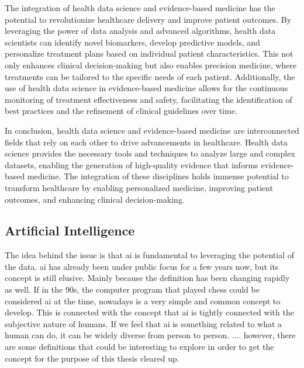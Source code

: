 
The integration of health data science and evidence-based medicine has the potential to revolutionize healthcare delivery and improve patient outcomes. By leveraging the power of data analysis and advanced algorithms, health data scientists can identify novel biomarkers, develop predictive models, and personalize treatment plans based on individual patient characteristics. This not only enhances clinical decision-making but also enables precision medicine, where treatments can be tailored to the specific needs of each patient. Additionally, the use of health data science in evidence-based medicine allows for the continuous monitoring of treatment effectiveness and safety, facilitating the identification of best practices and the refinement of clinical guidelines over time.

In conclusion, health data science and evidence-based medicine are interconnected fields that rely on each other to drive advancements in healthcare. Health data science provides the necessary tools and techniques to analyze large and complex datasets, enabling the generation of high-quality evidence that informs evidence-based medicine. The integration of these disciplines holds immense potential to transform healthcare by enabling personalized medicine, improving patient outcomes, and enhancing clinical decision-making.



\subsection{Artificial Intelligence}
The idea behind the issue is that \ac{ai} is fundamental to leveraging the potential of the data. \ac{ai} has already been under public focus for a few years now, but its concept is still elusive. 
Mainly because the definition has been changing rapidly as well. If in the 90s, the computer program that played chess could be considered \ac{ai} at the time, nowadays is a very simple and common concept to develop. This is connected with the concept that \ac{ai} is tightly connected with the subjective nature of humans. If we feel that \ac{ai} is something related to what a human can do, it can be widely diverse from person to person.
....
however, there are some definitions that could be interesting to explore in order to get the concept for the purpose of this thesis cleared up.

